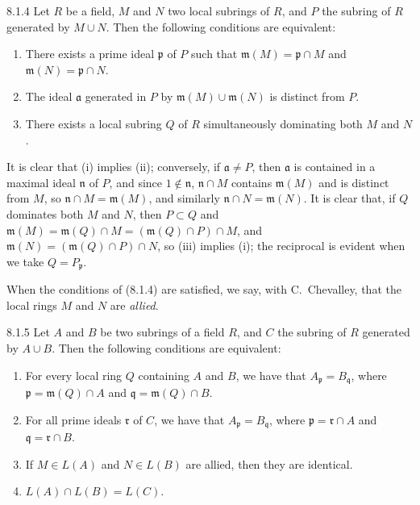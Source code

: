 \documentclass[../main.tex]{subfiles}
\begin{document}
\begin{cx}[Lemma]{8.1.4}
    Let $R$ be a field, $M$ and $N$ two local subrings of $R$, and $P$ the subring of $R$ generated by $M\cup N$.
    Then the following conditions are equivalent:
    \begin{enumerate}[label=(\roman*)]
        \item There exists a prime ideal $\mathfrak{p}$ of $P$ such that $\mathfrak{m}(M)=\mathfrak{p}\cap M$ and $\mathfrak{m}(N)=\mathfrak{p}\cap N$.
        \item The ideal $\mathfrak{a}$ generated in $P$ by $\mathfrak{m}(M)\cup\mathfrak{m}(N)$ is distinct from $P$.
        \item There exists a local subring $Q$ of $R$ simultaneously dominating both $M$ and $N$.
    \end{enumerate}
\end{cx}

It is clear that (i) implies (ii); conversely, if $\mathfrak{a}\neq P$, then $\mathfrak{a}$ is contained in a maximal ideal $\mathfrak{n}$ of $P$, and since $1\not\in\mathfrak{n}$, $\mathfrak{n}\cap M$ contains $\mathfrak{m}(M)$ and is distinct from $M$, so $\mathfrak{n}\cap M=\mathfrak{m}(M)$, and similarly $\mathfrak{n}\cap N=\mathfrak{m}(N)$.
It is clear that, if $Q$ dominates both $M$ and $N$, then $P\subset Q$ and $\mathfrak{m}(M)=\mathfrak{m}(Q)\cap M=(\mathfrak{m}(Q)\cap P)\cap M$, and $\mathfrak{m}(N)=(\mathfrak{m}(Q)\cap P)\cap N$, so (iii) implies (i); the reciprocal is evident when we take $Q=P_\mathfrak{p}$.

When the conditions of (8.1.4) are satisfied, we say, with C.~Chevalley, that the local rings $M$ and $N$ are \emph{allied}.

\begin{cx}[Proposition]{8.1.5}
    Let $A$ and $B$ be two subrings of a field $R$, and $C$ the subring of $R$ generated by $A\cup B$.
    Then the following conditions are equivalent:
    \begin{enumerate}[label=(\roman*)]
        \item For every local ring $Q$ containing $A$ and $B$, we have that $A_\mathfrak{p}=B_\mathfrak{q}$, where $\mathfrak{p}=\mathfrak{m}(Q)\cap A$ and $\mathfrak{q}=\mathfrak{m}(Q)\cap B$.
        \item For all prime ideals $\mathfrak{r}$ of $C$, we have that $A_\mathfrak{p}=B_\mathfrak{q}$, where $\mathfrak{p}=\mathfrak{r}\cap A$ and $\mathfrak{q}=\mathfrak{r}\cap B$.
        \item If $M\in L(A)$ and $N\in L(B)$ are allied, then they are identical.
        \item $L(A)\cap L(B)=L(C)$.
    \end{enumerate}
\end{cx}
\end{document}
